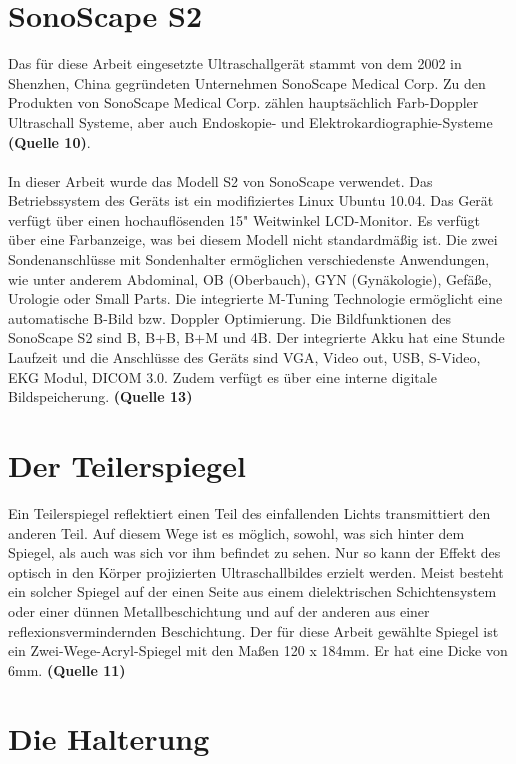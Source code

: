 \section{SonoScape S2}

Das für diese Arbeit eingesetzte Ultraschallgerät stammt von dem 2002 in Shenzhen, China gegründeten Unternehmen SonoScape Medical Corp. Zu den Produkten von SonoScape Medical Corp. zählen hauptsächlich Farb-Doppler Ultraschall Systeme, aber auch Endoskopie- und Elektrokardiographie-Systeme \textbf{(Quelle 10)}.
\\
\\
In dieser Arbeit wurde das Modell S2 von SonoScape verwendet. Das Betriebssystem des Geräts ist ein modifiziertes Linux Ubuntu 10.04. Das Gerät verfügt über einen hochauflösenden 15" Weitwinkel LCD-Monitor. Es verfügt über eine Farbanzeige, was bei diesem Modell nicht standardmäßig ist. Die zwei Sondenanschlüsse mit Sondenhalter ermöglichen verschiedenste Anwendungen, wie unter anderem Abdominal, OB (Oberbauch), GYN (Gynäkologie), Gefäße, Urologie oder Small Parts. Die integrierte M-Tuning Technologie ermöglicht eine automatische B-Bild bzw. Doppler Optimierung. Die Bildfunktionen des SonoScape S2 sind B, B+B, B+M und 4B. Der integrierte Akku hat eine Stunde Laufzeit und die Anschlüsse des Geräts sind VGA, Video out, USB, S-Video, EKG Modul, DICOM 3.0. Zudem verfügt es über eine interne digitale Bildspeicherung. \textbf{(Quelle 13)}

\section{Der Teilerspiegel}

Ein Teilerspiegel reflektiert einen Teil des einfallenden Lichts transmittiert den anderen Teil. Auf diesem Wege ist es möglich, sowohl, was sich hinter dem Spiegel, als auch was sich vor ihm befindet zu sehen. Nur so kann der Effekt des optisch in den Körper projizierten Ultraschallbildes erzielt werden. Meist besteht ein solcher Spiegel auf der einen Seite aus einem dielektrischen Schichtensystem oder einer dünnen Metallbeschichtung und auf der anderen aus einer reflexionsvermindernden Beschichtung. Der für diese Arbeit gewählte Spiegel ist ein Zwei-Wege-Acryl-Spiegel mit den Maßen 120 x 184mm. Er hat eine Dicke von 6mm. \textbf{(Quelle 11)}

\section{Die Halterung}

